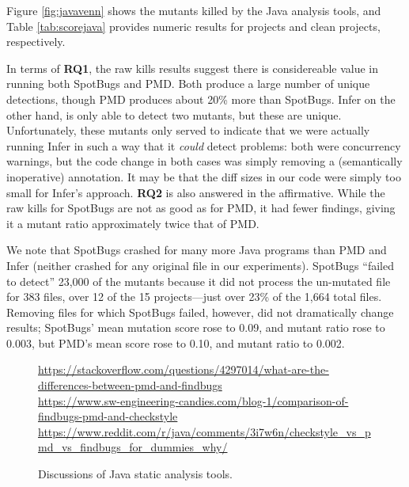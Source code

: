 Figure \ref{fig:javavenn} shows the mutants killed by the Java analysis tools, and Table \ref{tab:scorejava} provides numeric results for projects and clean projects, respectively.

In terms of {\bf RQ1}, the raw kills results suggest there is considereable value in running both SpotBugs and PMD.  Both produce a large number of unique detections, though PMD produces about 20\% more than SpotBugs.
Infer on the other hand, is only able to detect two mutants, but these are unique.  Unfortunately, these mutants only served to indicate that we were actually running Infer in such a way that it \emph{could} detect problems:  both were concurrency warnings, but the code change in both cases was simply removing a (semantically inoperative) {\tt \@Override} annotation.  It may be that the diff sizes in our code were simply too small for Infer's approach.
{\bf RQ2} is also answered in the affirmative.  While the raw kills for SpotBugs are not as good as for PMD, it had fewer findings, giving it a mutant ratio approximately twice that of PMD.

We note that SpotBugs crashed for many more Java programs than PMD and Infer (neither crashed for any original file in our experiments).  SpotBugs ``failed to detect'' 23,000 of the mutants because it did not process the un-mutated file for 383 files, over 12 of the 15 projects---just over 23\% of the 1,664 total files.  Removing files for which SpotBugs failed, however, did not dramatically change results; SpotBugs' mean mutation score rose to 0.09, and mutant ratio rose to 0.003, but PMD's mean score rose to 0.10, and mutant ratio to 0.002.

\begin{figure}
  {\scriptsize
    \raggedright    
  \url{https://stackoverflow.com/questions/4297014/what-are-the-differences-between-pmd-and-findbugs} \\
  \url{https://www.sw-engineering-candies.com/blog-1/comparison-of-findbugs-pmd-and-checkstyle} \\
  \url{https://www.reddit.com/r/java/comments/3i7w6n/checkstyle_vs_pmd_vs_findbugs_for_dummies_why/} \\
  }
\caption{Discussions of Java static analysis tools.}
\label{fig:blog}
\end{figure}

